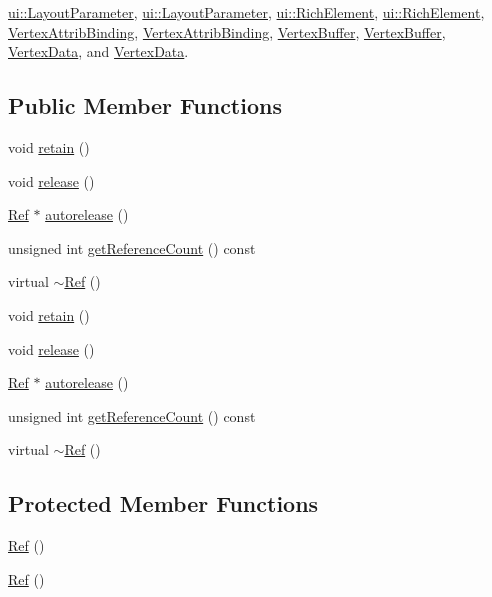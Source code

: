 \hyperlink{classui_1_1LayoutParameter}{ui\+::\+Layout\+Parameter}, \hyperlink{classui_1_1LayoutParameter}{ui\+::\+Layout\+Parameter}, \hyperlink{classui_1_1RichElement}{ui\+::\+Rich\+Element}, \hyperlink{classui_1_1RichElement}{ui\+::\+Rich\+Element}, \hyperlink{classVertexAttribBinding}{Vertex\+Attrib\+Binding}, \hyperlink{classVertexAttribBinding}{Vertex\+Attrib\+Binding}, \hyperlink{classVertexBuffer}{Vertex\+Buffer}, \hyperlink{classVertexBuffer}{Vertex\+Buffer}, \hyperlink{classVertexData}{Vertex\+Data}, and \hyperlink{classVertexData}{Vertex\+Data}.

\subsection*{Public Member Functions}
\begin{DoxyCompactItemize}
\item 
void \hyperlink{classRef_a7d182cae1be1e80a9884cacd6ff9cb01}{retain} ()
\item 
void \hyperlink{classRef_a6c8528cd8731765688943496c2eb3907}{release} ()
\item 
\hyperlink{classRef}{Ref} $\ast$ \hyperlink{classRef_a065f6972ebb82de3e2143cbf10a7ac2d}{autorelease} ()
\item 
unsigned int \hyperlink{classRef_a27b894ccc4c74b0c52f3fa2993f04ba0}{get\+Reference\+Count} () const
\item 
virtual \hyperlink{classRef_a1c3c3986014151251b39041e2556d2e3}{$\sim$\+Ref} ()
\item 
void \hyperlink{classRef_a7d182cae1be1e80a9884cacd6ff9cb01}{retain} ()
\item 
void \hyperlink{classRef_a6c8528cd8731765688943496c2eb3907}{release} ()
\item 
\hyperlink{classRef}{Ref} $\ast$ \hyperlink{classRef_a544b29e4e4b0c7fb32ccb6bf92d28da9}{autorelease} ()
\item 
unsigned int \hyperlink{classRef_a27b894ccc4c74b0c52f3fa2993f04ba0}{get\+Reference\+Count} () const
\item 
virtual \hyperlink{classRef_a97a445f43f3935f3ee6f34ebdec55d12}{$\sim$\+Ref} ()
\end{DoxyCompactItemize}
\subsection*{Protected Member Functions}
\begin{DoxyCompactItemize}
\item 
\hyperlink{classRef_ab9cf238c39cc7fc6ffde82c8d94c465e}{Ref} ()
\item 
\hyperlink{classRef_a63f1608b3c105a76e3d0ff1b77d2ae8e}{Ref} ()
\end{DoxyCompactItemize}
